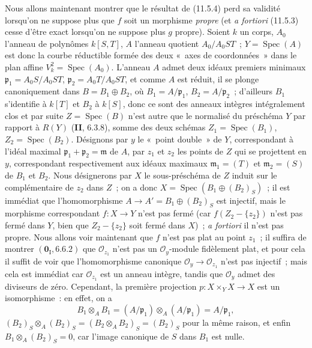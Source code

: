 \begin{env}[11.7.2]
\label{IV.11.7.2-fr}
Nous allons maintenant montrer que le résultat de (11.5.4) perd sa validité
lorsqu'on ne suppose plus que $f$ soit un morphisme \emph{propre} (et
\emph{a fortiori} (11.5.3) cesse d'être exact lorsqu'on ne suppose plus $g$
propre). Soient $k$ un corps, $A_0$ l'anneau de polynômes $k[S,T]$, $A$
l'anneau quotient $A_0/A_0ST$~; $Y=\operatorname{Spec}(A)$ est donc la courbe
réductible formée des deux «~axes de coordonnées~» dans le plan affine
$V_k^2=\operatorname{Spec}(A_0)$. L'anneau $A$ admet deux idéaux premiers
minimaux $\mathfrak p_1=A_0S/A_0ST$, $\mathfrak p_2=A_0T/A_0ST$, et comme $A$
est réduit, il se plonge canoniquement dans $B=B_1\oplus B_2$, où
$B_1=A/\mathfrak p_1$, $B_2=A/\mathfrak p_2$~; d'ailleurs $B_1$ s'identifie à
$k[T]$ et $B_2$ à $k[S]$, donc ce sont des anneaux intègres intégralement clos
et par suite $Z=\operatorname{Spec}(B)$ n'est autre que le normalisé du
préschéma $Y$ par rapport à $R(Y)$ (\textbf{II}, 6.3.8), somme des deux schémas
$Z_1=\operatorname{Spec}(B_1)$, $Z_2=\operatorname{Spec}(B_2)$. Désignons par
$y$ le «~point double~» de $Y$, correspondant à l'idéal maximal
$\mathfrak p_1+\mathfrak p_2=\mathfrak m$ de $A$, par $z_1$ et $z_2$ les
points de $Z$ qui se projettent en $y$, correspondant respectivement aux idéaux
maximaux $\mathfrak m_1=(T)$ et $\mathfrak m_2=(S)$ de $B_1$ et $B_2$. Nous
désignerons par $X$ le sous-préschéma de $Z$ induit sur le complémentaire de
$z_2$ dans $Z$~; on a donc
$X=\operatorname{Spec}(B_1\oplus(B_2)_S)$~; il est immédiat que
l'homomorphisme $A\to A'=B_1\oplus(B_2)_S$ est injectif, mais le morphisme
correspondant $f:X\to Y$ n'est pas fermé (car $f(Z_2-\{z_2\})$ n'est pas fermé
dans $Y$, bien que $Z_2-\{z_2\}$ soit fermé dans $X$)~; \emph{a fortiori} il
n'est pas propre. Nous allons voir maintenant que $f$ n'est pas plat au point
$z_1$~; il suffira de montrer $(\mathbf 0_{\mathrm I},6.6.2)$ que
$\mathcal O_{z_1}$ n'est pas un $\mathcal O_y$-module fidèlement plat, et pour
cela il suffit de voir que l'homomorphisme canonique
$\mathcal O_y\to\mathcal O_{z_1}$ n'est pas injectif~; mais cela est immédiat
car $\mathcal O_{z_1}$ est un anneau intègre, tandis que $\mathcal O_y$ admet
des diviseurs de zéro. Cependant, la première projection
$p:X\times_Y X\to X$ est un isomorphisme~: en effet, on a
\[
B_1\otimes_A B_1=(A/\mathfrak p_1)\otimes_A(A/\mathfrak p_1)=A/\mathfrak p_1,
\]
$(B_2)_S\otimes_A(B_2)_S=(B_2\otimes_A B_2)_S=(B_2)_S$ pour la même raison,
et enfin $B_1\otimes_A(B_2)_S=0$, car l'image canonique de $S$ dans $B_1$ est
nulle.
\end{env}

